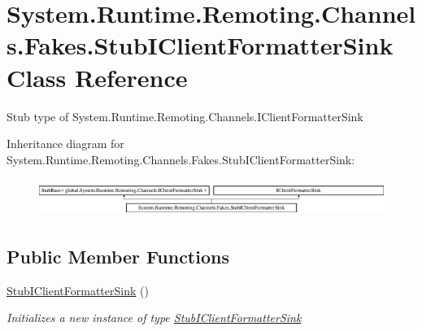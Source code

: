 \hypertarget{class_system_1_1_runtime_1_1_remoting_1_1_channels_1_1_fakes_1_1_stub_i_client_formatter_sink}{\section{System.\-Runtime.\-Remoting.\-Channels.\-Fakes.\-Stub\-I\-Client\-Formatter\-Sink Class Reference}
\label{class_system_1_1_runtime_1_1_remoting_1_1_channels_1_1_fakes_1_1_stub_i_client_formatter_sink}
}


Stub type of System.\-Runtime.\-Remoting.\-Channels.\-I\-Client\-Formatter\-Sink 


Inheritance diagram for System.\-Runtime.\-Remoting.\-Channels.\-Fakes.\-Stub\-I\-Client\-Formatter\-Sink\-:\begin{figure}[H]
\begin{center}
\leavevmode
\includegraphics[height=1.238938cm]{class_system_1_1_runtime_1_1_remoting_1_1_channels_1_1_fakes_1_1_stub_i_client_formatter_sink}
\end{center}
\end{figure}
\subsection*{Public Member Functions}
\begin{DoxyCompactItemize}
\item 
\hyperlink{class_system_1_1_runtime_1_1_remoting_1_1_channels_1_1_fakes_1_1_stub_i_client_formatter_sink_a29f2c6b7b4e6b1b209a80abe2eeeb908}{Stub\-I\-Client\-Formatter\-Sink} ()
\begin{DoxyCompactList}\small\item\em Initializes a new instance of type \hyperlink{class_system_1_1_runtime_1_1_remoting_1_1_channels_1_1_fakes_1_1_stub_i_client_formatter_sink}{Stub\-I\-Client\-Formatter\-Sink}\end{DoxyCompactList}\end{DoxyCompactItemize}
